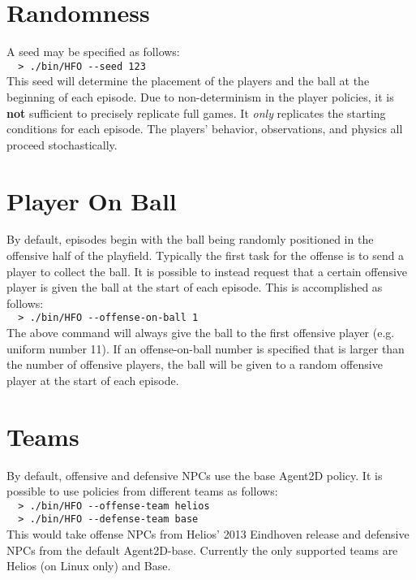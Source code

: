 \documentclass[12pt]{article}
\begin{document}
\section{Randomness}
A seed may be specified as follows:\\

\noindent \verb+  > ./bin/HFO --seed 123+\\

This seed will determine the placement of the players and the ball at
the beginning of each episode. Due to non-determinism in the player
policies, it is \textbf{not} sufficient to precisely replicate full games. It
\textit{only} replicates the starting conditions for each episode. The
players' behavior, observations, and physics all proceed
stochastically.

\section{Player On Ball}
By default, episodes begin with the ball being randomly positioned in
the offensive half of the playfield. Typically the first task for the
offense is to send a player to collect the ball. It is possible to
instead request that a certain offensive player is given the ball at
the start of each episode. This is accomplished as follows:\\

\noindent \verb+  > ./bin/HFO --offense-on-ball 1+\\

The above command will always give the ball to the first offensive
player (e.g. uniform number 11). If an offense-on-ball number is
specified that is larger than the number of offensive players, the
ball will be given to a random offensive player at the start of each
episode.

\section{Teams}
By default, offensive and defensive NPCs use the base Agent2D
policy. It is possible to use policies from different teams as
follows:\\

\noindent \verb+  > ./bin/HFO --offense-team helios+\\
\noindent \verb+  > ./bin/HFO --defense-team base+\\

This would take offense NPCs from Helios' 2013 Eindhoven release and
defensive NPCs from the default Agent2D-base. Currently the only
supported teams are Helios (on Linux only) and Base.
\end{document}
